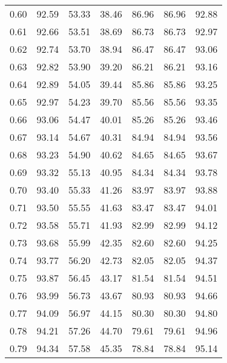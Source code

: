 \begin{tabular}{|c|c|c|c|c|c|c|}
      0.60 &     92.59 &     53.33 &      38.46 &   86.96 &      86.96 &         92.88 \\
      0.61 &     92.66 &     53.51 &      38.69 &   86.73 &      86.73 &         92.97 \\
      0.62 &     92.74 &     53.70 &      38.94 &   86.47 &      86.47 &         93.06 \\
      0.63 &     92.82 &     53.90 &      39.20 &   86.21 &      86.21 &         93.16 \\
      0.64 &     92.89 &     54.05 &      39.44 &   85.86 &      85.86 &         93.25 \\
      0.65 &     92.97 &     54.23 &      39.70 &   85.56 &      85.56 &         93.35 \\
      0.66 &     93.06 &     54.47 &      40.01 &   85.26 &      85.26 &         93.46 \\
      0.67 &     93.14 &     54.67 &      40.31 &   84.94 &      84.94 &         93.56 \\
      0.68 &     93.23 &     54.90 &      40.62 &   84.65 &      84.65 &         93.67 \\
      0.69 &     93.32 &     55.13 &      40.95 &   84.34 &      84.34 &         93.78 \\
      0.70 &     93.40 &     55.33 &      41.26 &   83.97 &      83.97 &         93.88 \\
      0.71 &     93.50 &     55.55 &      41.63 &   83.47 &      83.47 &         94.01 \\
      0.72 &     93.58 &     55.71 &      41.93 &   82.99 &      82.99 &         94.12 \\
      0.73 &     93.68 &     55.99 &      42.35 &   82.60 &      82.60 &         94.25 \\
      0.74 &     93.77 &     56.20 &      42.73 &   82.05 &      82.05 &         94.37 \\
      0.75 &     93.87 &     56.45 &      43.17 &   81.54 &      81.54 &         94.51 \\
      0.76 &     93.99 &     56.73 &      43.67 &   80.93 &      80.93 &         94.66 \\
      0.77 &     94.09 &     56.97 &      44.15 &   80.30 &      80.30 &         94.80 \\
      0.78 &     94.21 &     57.26 &      44.70 &   79.61 &      79.61 &         94.96 \\
      0.79 &     94.34 &     57.58 &      45.35 &   78.84 &      78.84 &         95.14 \\

\end{tabular}
